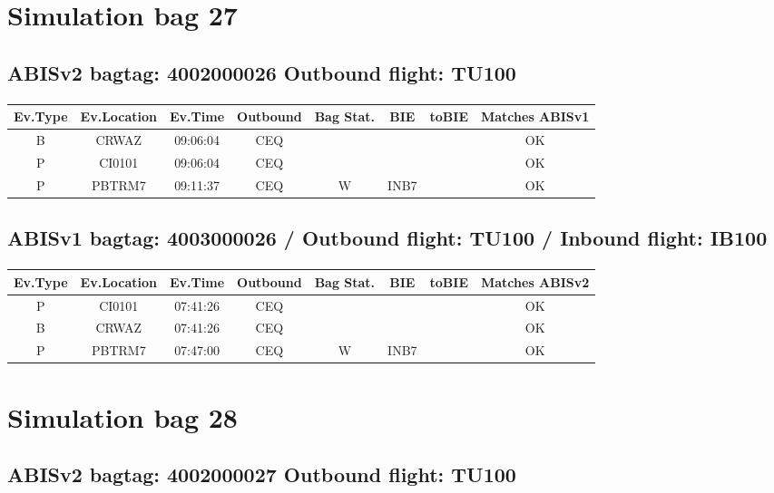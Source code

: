 \documentclass{report}
\begin{document}
\section*{Simulation bag 27}
\subsection*{ABISv2 bagtag: 4002000026 Outbound flight: TU100}
\paragraph{}
\begin{longtable}{cccccccc}    \toprule
\rowcolor{white!50}
\textbf{Ev.Type} & \textbf{Ev.Location} & \textbf{Ev.Time} & \textbf{Outbound} & \textbf{Bag Stat.} & \textbf{BIE} & \textbf{toBIE} & \textbf{Matches ABISv1} \\\midrule
B & CRWAZ & 09:06:04  & CEQ &  &  &  & OK\\
P & CI0101 & 09:06:04  & CEQ &  &  &  & OK\\
P & PBTRM7 & 09:11:37  & CEQ & W & INB7 &  & OK\\
\bottomrule
\end{longtable}
\subsection*{ABISv1 bagtag: 4003000026 / Outbound flight: TU100 / Inbound flight: IB100}
\paragraph{}
\begin{longtable}{cccccccc}    \toprule
\rowcolor{white!50}
\textbf{Ev.Type} & \textbf{Ev.Location} & \textbf{Ev.Time} & \textbf{Outbound} & \textbf{Bag Stat.} & \textbf{BIE} & \textbf{toBIE} & \textbf{Matches ABISv2} \\\midrule
P & CI0101 & 07:41:26  & CEQ &  &  &  & OK\\
B & CRWAZ & 07:41:26  & CEQ &  &  &  & OK\\
P & PBTRM7 & 07:47:00  & CEQ & W & INB7 &  & OK\\
\bottomrule
\end{longtable}
\pagebreak
\section*{Simulation bag 28}
\subsection*{ABISv2 bagtag: 4002000027 Outbound flight: TU100}
\end{document}
